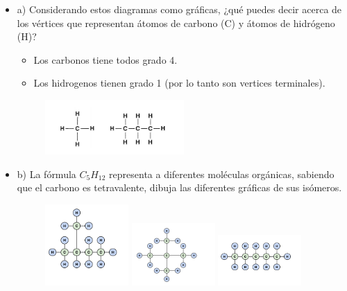 \documentclass[journal,12pt,onecolumn]{IEEEtran}                %
\theoremstyle{break}                                            %
\begin{document}
        \begin{itemize}
            \item 
                a) Considerando estos diagramas como 
                gráficas, ¿qué puedes decir acerca de los vértices 
                que representan átomos de carbono (C) y átomos de hidrógeno (H)?
                \begin{itemize}
                    \item Los carbonos tiene todos grado 4.
                    \item Los hidrogenos tienen grado 1 (por lo tanto son vertices terminales).
                \end{itemize}

                \begin{figure}[h]
                    \includegraphics[width=0.5\textwidth]{8}
                \end{figure}

            \item 
                b) La fórmula $C_5H_{12}$ representa a diferentes moléculas orgánicas, 
                sabiendo que el carbono es tetravalente, dibuja las diferentes 
                gráficas de sus isómeros.

                \begin{figure}[h]
                    \includegraphics[width=0.3\textwidth]{81}
                    \includegraphics[width=0.3\textwidth]{82}
                    \includegraphics[width=0.3\textwidth]{83}
                \end{figure}


\end{itemize}
\end{document}
